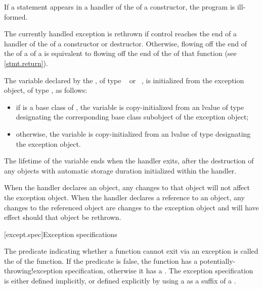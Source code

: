 \pnum
If a  statement appears in a handler of the
of a
constructor, the program is ill-formed.

\pnum
The currently handled exception
is rethrown if control reaches the end of a handler of the
of a constructor or destructor.
Otherwise, flowing off the end of
the 
of a 
of a 
is equivalent to flowing off the end of
the 
of that function (see \ref{stmt.return}).

\pnum
The variable declared by the , of type
\cv{}~ or \cv{}~, is initialized from the exception object,
of type , as follows:
\begin{itemize}
\item
if  is a base class of ,
the variable is copy-initialized
from an lvalue of type  designating the corresponding base class subobject
of the exception object;
\item otherwise, the variable is copy-initialized
from an lvalue of type  designating the exception object.
\end{itemize}

The lifetime of the variable ends
when the handler exits, after the
destruction of any objects with automatic storage duration initialized
within the handler.

\pnum
When the handler declares an object,
any changes to that object will not affect the exception object.
When the handler declares a reference to an object,
any changes to the referenced object are changes to the
exception object and will have effect should that object be rethrown.%
%

[except.spec]{Exception specifications}%

\pnum
The predicate indicating whether a function cannot exit via an exception
is called the  of the function.
If the predicate is false,
the function has a
%
%
{potentially-throwing!exception specification},
otherwise it has a
%
.
The exception specification is either defined implicitly,
or defined explicitly
by using a 
as a suffix of a .

